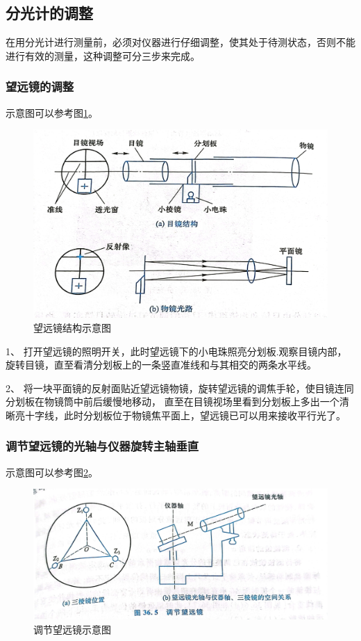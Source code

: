 \documentclass{ctexart}
\begin{document}
  \subsection{分光计的调整}
  在用分光计进行测量前，必须对仪器进行仔细调整，使其处于待测状态，否则不能进行有效的测量，这种调整可分三步来完成。
    \subsubsection{望远镜的调整}
    示意图可以参考图\ref{wangyuanjingjiegou}。
    \begin{figure}[H]
      \centering
      \includegraphics[height=0.4\textwidth,width=1\textwidth]{wangyuanjingjiegou.jpg}
      \caption{望远镜结构示意图}\label{wangyuanjingjiegou}
    \end{figure}

    1、 打开望远镜的照明开关，此时望远镜下的小电珠照亮分划板.观察目镜内部，旋转目镜，直至看清分划板上的一条竖直准线和与其相交的两条水平线。

    2、 将一块平面镜的反射面贴近望远镜物镜，旋转望远镜的调焦手轮，使目镜连同分划板在物镜筒中前后缓慢地移动，
    直至在目镜视场里看到分划板上多出一个清晰亮十字线，此时分划板位于物镜焦平面上，望远镜已可以用来接收平行光了。

    \subsubsection{调节望远镜的光轴与仪器旋转主轴垂直}
    示意图可以参考图\ref{tiaojiewangyuanjing}。
    \begin{figure}[H]
      \centering
      \includegraphics[height=0.5\textwidth,width=1\textwidth]{tiaojiewangyuanjing.jpg}
      \caption{调节望远镜示意图}\label{tiaojiewangyuanjing}
    \end{figure}
\end{document}
